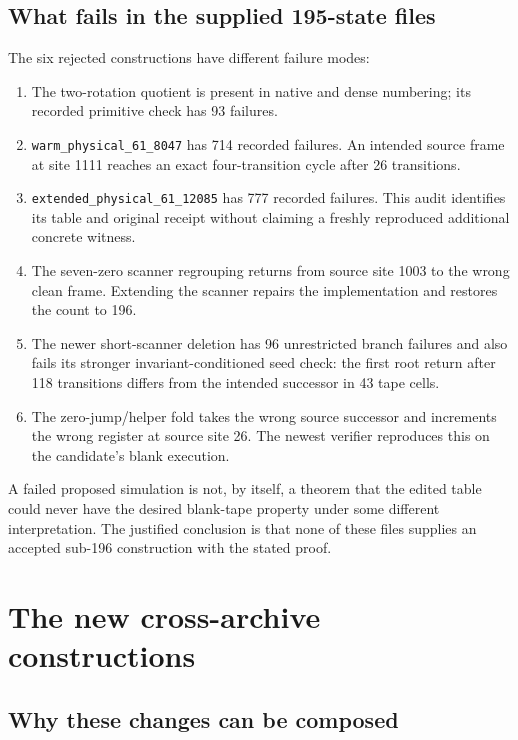 \documentclass[11pt,letterpaper]{article}
\newcommand{\file}[1]{\texttt{\nolinkurl{#1}}}
\begin{document}
\subsection{What fails in the supplied 195-state files}

The six rejected constructions have different failure modes:

\begin{enumerate}
\item The two-rotation quotient is present in native and dense numbering;
its recorded primitive check has 93 failures.
\item \file{warm_physical_61_8047} has 714 recorded failures. An intended
source frame at site 1111 reaches an exact four-transition cycle after
26 transitions.
\item \file{extended_physical_61_12085} has 777 recorded failures.
This audit identifies its table and original receipt without claiming a
freshly reproduced additional concrete witness.
\item The seven-zero scanner regrouping returns from source site 1003
to the wrong clean frame. Extending the scanner repairs the implementation
and restores the count to 196.
\item The newer short-scanner deletion has 96 unrestricted branch
failures and also fails its stronger invariant-conditioned seed check:
the first root return after 118 transitions differs from the intended
successor in 43 tape cells.
\item The zero-jump/helper fold takes the wrong source successor and
increments the wrong register at source site 26. The newest verifier
reproduces this on the candidate's blank execution.
\end{enumerate}

A failed proposed simulation is not, by itself, a theorem that the edited
table could never have the desired blank-tape property under some
different interpretation. The justified conclusion is that none of these
files supplies an accepted sub-196 construction with the stated proof.

\section{The new cross-archive constructions}
\subsection{Why these changes can be composed}
\end{document}
